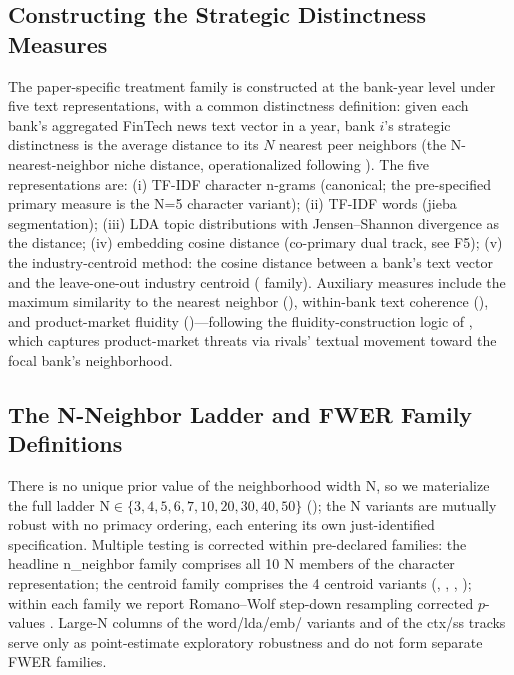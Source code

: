 \subsection{Constructing the Strategic Distinctness Measures}\label{sec:method-stratdiff}
The paper-specific treatment family  is
constructed at the bank-year level under five text representations,
with a common distinctness definition: given each bank's aggregated
FinTech news text vector in a year, bank $i$'s strategic distinctness
is the average distance to its $N$ nearest peer neighbors (the
N-nearest-neighbor niche distance, operationalized following
\textcite{guzman2023strategy}). The five representations
are: (i) TF-IDF character n-grams (canonical; the pre-specified
primary measure  is the N=5 character variant);
(ii) TF-IDF words (jieba segmentation); (iii) LDA topic
distributions with Jensen--Shannon divergence as the distance;
(iv) embedding cosine distance (co-primary dual track, see F5);
(v) the industry-centroid method: the cosine distance between a
bank's text vector and the leave-one-out industry centroid
( family). Auxiliary measures include the
maximum similarity to the nearest neighbor (),
within-bank text coherence (), and
product-market fluidity ()---following the
fluidity-construction logic of \textcite{hoberg2014fluidity}, which captures
product-market threats via rivals' textual movement toward the
focal bank's neighborhood.

\subsection{The N-Neighbor Ladder and FWER Family Definitions}\label{sec:method-fwer}
There is no unique prior value of the neighborhood width N, so we
materialize the full ladder N$\in\{3,4,5,6,7,10,20,30,40,50\}$
(); the N variants are mutually robust with
no primacy ordering, each entering its own just-identified
specification. Multiple testing is corrected within pre-declared
families: the headline n\_neighbor family comprises all 10 N members
of the character representation; the centroid family comprises the 4
centroid variants (,
, ,
);
within each family we report Romano--Wolf step-down resampling
corrected $p$-values \parencite{romano2005stepwise}. Large-N columns
of the word/lda/emb/ variants and of the ctx/ss tracks
serve only as point-estimate exploratory robustness and do not form
separate FWER families.

